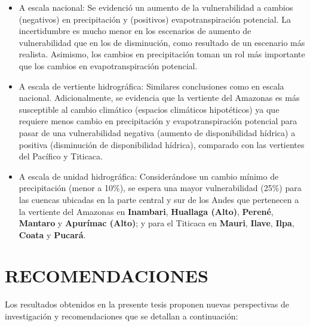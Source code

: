 \documentclass[12pt]{article}
\begin{document}
\begin{itemize}
    \begin{itemize}
        \item A escala nacional: Se evidenció un aumento de la vulnerabilidad a cambios (negativos) en precipitación y (positivos) evapotranspiración potencial. La incertidumbre es mucho menor en los escenarios de aumento de vulnerabilidad que en los de disminución, como resultado de un escenario más realista. Asimismo, los cambios en precipitación toman un rol más importante que los cambios en evapotranspiración potencial. 
        \item A escala de vertiente hidrográfica: Similares conclusiones como en escala nacional. Adicionalmente, se evidencia que la vertiente del Amazonas es más susceptible al cambio climático (espacios climáticos hipotéticos) ya que requiere menos cambio en precipitación y evapotranspiración potencial para pasar de una vulnerabilidad negativa (aumento de disponibilidad hídrica) a positiva (disminución de disponibilidad hídrica), comparado con las vertientes del Pacífico y Titicaca.
        \item A escala de unidad hidrográfica: Considerándose un cambio mínimo de precipitación (menor a 10\%), se espera una mayor vulnerabilidad (25\%) para las cuencas ubicadas en la parte central y sur de los Andes que pertenecen a la vertiente del Amazonas en \textbf{Inambari}, \textbf{Huallaga (Alto)}, \textbf{Perené}, \textbf{Mantaro} y \textbf{Apurímac (Alto)}; y para el Titicaca en \textbf{Mauri}, \textbf{Ilave}, \textbf{Ilpa}, \textbf{Coata} y \textbf{Pucará}.
    \end{itemize}
    
\end{itemize}


\clearpage
\vspace*{0.5mm}
\section{RECOMENDACIONES}

\thispagestyle{empty}

Los resultados obtenidos en la presente tesis proponen nuevas perspectivas de investigación y recomendaciones que se detallan a continuación:
\end{document}
